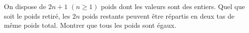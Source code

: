 On dispose de $2n + 1$ $(n \geq 1)$ poids dont les valeurs sont des entiers. Quel que soit le poids retiré, les $2n$ poids restants peuvent être répartis en deux tas de même poids total. Montrer que tous les poids sont égaux.
